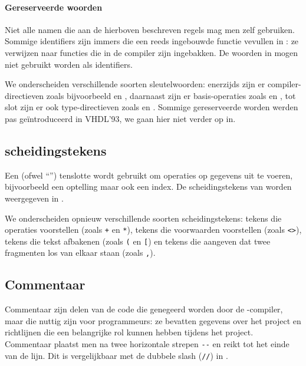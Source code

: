 \paragraph{Gereserveerde woorden}Niet alle namen die aan de hierboven beschreven regels mag men zelf gebruiken. Sommige identifiers zijn immers  die een reeds ingebouwde functie vevullen in \tvhdl{}: ze verwijzen naar functies die in de \tvhdl{} compiler zijn ingebakken. De woorden in  mogen niet gebruikt worden als identifiers.


We onderscheiden verschillende soorten sleutelwoorden: enerzijds zijn er compiler-directieven zoals bijvoorbeeld  en , daarnaast zijn er basis-operaties zoals  en , tot slot zijn er ook type-directieven zoals  en . Sommige gereserveerde worden werden pas ge\"introduceerd in VHDL'93, we gaan hier niet verder op in.

\subsection{scheidingstekens}
Een  (ofwel ``'') tenslotte wordt gebruikt om operaties op gegevens uit te voeren, bijvoorbeeld een optelling maar ook een index. De
scheidingstekens van \tvhdl{} worden weergegeven in .


We onderscheiden opnieuw verschillende soorten scheidingstekens: tekens die operaties voorstellen (zoals \texttt{+} en \texttt{*}), tekens die voorwaarden voorstellen (zoals \texttt{<>}), tekens die tekst afbakenen (zoals \texttt{(} en \texttt{[}) en tekens die aangeven dat twee fragmenten los van elkaar staan (zoals \texttt{,}).

\subsection{Commentaar}
Commentaar zijn delen van de code die genegeerd worden door de \tvhdl{}-compiler, maar die nuttig zijn voor programmeurs: ze bevatten gegevens over het project en richtlijnen die een belangrijke rol kunnen hebben tijdens het project. Commentaar plaatst men na twee horizontale strepen \verb+--+ en reikt tot het einde van de lijn. Dit is vergelijkbaar met de dubbele slash (\verb+//+) in \tjava{}.

